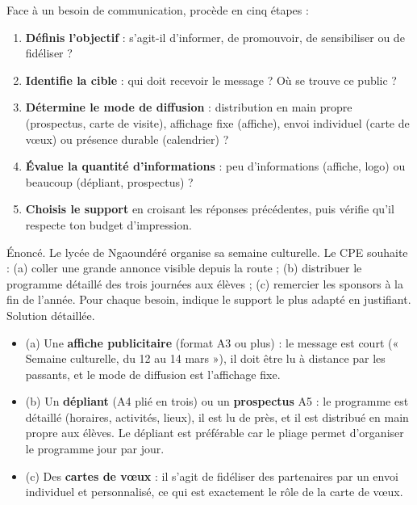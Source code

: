 \documentclass[11pt]{article}
\begin{document}
\begin{methode}
Face à un besoin de communication, procède en cinq étapes :
\begin{enumerate}
  \item \textbf{Définis l'objectif} : s'agit-il d'informer, de promouvoir, de sensibiliser ou de fidéliser ?
  \item \textbf{Identifie la cible} : qui doit recevoir le message ? Où se trouve ce public ?
  \item \textbf{Détermine le mode de diffusion} : distribution en main propre (prospectus, carte de visite), affichage fixe (affiche), envoi individuel (carte de vœux) ou présence durable (calendrier) ?
  \item \textbf{Évalue la quantité d'informations} : peu d'informations (affiche, logo) ou beaucoup (dépliant, prospectus) ?
  \item \textbf{Choisis le support} en croisant les réponses précédentes, puis vérifie qu'il respecte ton budget d'impression.
\end{enumerate}
\end{methode}

\begin{exoresolu}
Énoncé. Le lycée de Ngaoundéré organise sa semaine culturelle. Le CPE souhaite : (a) coller une grande annonce visible depuis la route ; (b) distribuer le programme détaillé des trois journées aux élèves ; (c) remercier les sponsors à la fin de l'année. Pour chaque besoin, indique le support le plus adapté en justifiant.
\tcblower
Solution détaillée.
\begin{itemize}
  \item (a) Une \textbf{affiche publicitaire} (format A3 ou plus) : le message est court (« Semaine culturelle, du 12 au 14 mars »), il doit être lu à distance par les passants, et le mode de diffusion est l'affichage fixe.
  \item (b) Un \textbf{dépliant} (A4 plié en trois) ou un \textbf{prospectus} A5 : le programme est détaillé (horaires, activités, lieux), il est lu de près, et il est distribué en main propre aux élèves. Le dépliant est préférable car le pliage permet d'organiser le programme jour par jour.
  \item (c) Des \textbf{cartes de vœux} : il s'agit de fidéliser des partenaires par un envoi individuel et personnalisé, ce qui est exactement le rôle de la carte de vœux.
\end{itemize}
\end{exoresolu}
\end{document}
